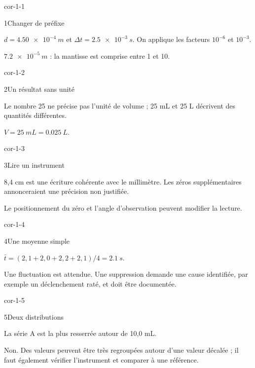 \clearpage{}
\corrigesSouples
\begin{blocLivre}{cor-1-1}\begin{corrige}{1}{Changer de préfixe}
\begin{questions}
\item $d=\qty{4,50e-4}{m}$ et $\Delta t=\qty{2,5e-3}{s}$. On applique les facteurs $10^{-6}$ et $10^{-3}$.
\item $\qty{7,2e-5}{m}$ : la mantisse est comprise entre 1 et 10.
\end{questions}
\end{corrige}\end{blocLivre}
\begin{blocLivre}{cor-1-2}\begin{corrige}{2}{Un résultat sans unité}
\begin{questions}
\item Le nombre 25 ne précise pas l’unité de volume ; 25 mL et 25 L décrivent des quantités différentes.
\item $V=\qty{25}{mL}=\qty{0,025}{L}$.
\end{questions}
\end{corrige}\end{blocLivre}
\begin{blocLivre}{cor-1-3}\begin{corrige}{3}{Lire un instrument}
\begin{questions}
\item 8,4 cm est une écriture cohérente avec le millimètre. Les zéros supplémentaires annonceraient une précision non justifiée.
\item Le positionnement du zéro et l’angle d’observation peuvent modifier la lecture.
\end{questions}
\end{corrige}\end{blocLivre}
\begin{blocLivre}{cor-1-4}\begin{corrige}{4}{Une moyenne simple}
\begin{questions}
\item $\bar t=(2,1+2,0+2,2+2,1)/4=\qty{2,1}{s}$.
\item Une fluctuation est attendue. Une suppression demande une cause identifiée, par exemple un déclenchement raté, et doit être documentée.
\end{questions}
\end{corrige}\end{blocLivre}
\begin{blocLivre}{cor-1-5}\begin{corrige}{5}{Deux distributions}
\begin{questions}
\item La série A est la plus resserrée autour de 10,0 mL.
\item Non. Des valeurs peuvent être très regroupées autour d’une valeur décalée ; il faut également vérifier l’instrument et comparer à une référence.
\end{questions}
\end{corrige}\end{blocLivre}
